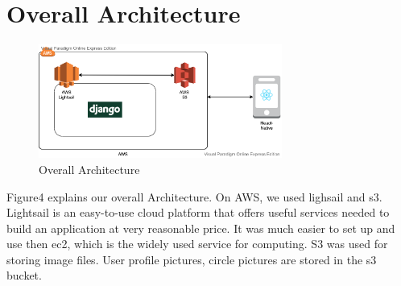 \documentclass[conference]{IEEEtran}
\begin{document}
\section{Overall Architecture}
\begin{figure}[h]
    \centering
    \includegraphics[width=8cm]{images/AWS.png}
    \caption{Overall Architecture}
    \label{fig:my_label}
\end{figure}
Figure4 explains our overall Architecture. On AWS, we used lighsail and s3. Lightsail is an easy-to-use cloud platform that offers useful services needed to build an application at very reasonable price. It was much easier to set up and use then ec2, which is the widely used service for computing. S3 was used for storing image files. User profile pictures, circle pictures are stored in the s3 bucket.
\end{document}
